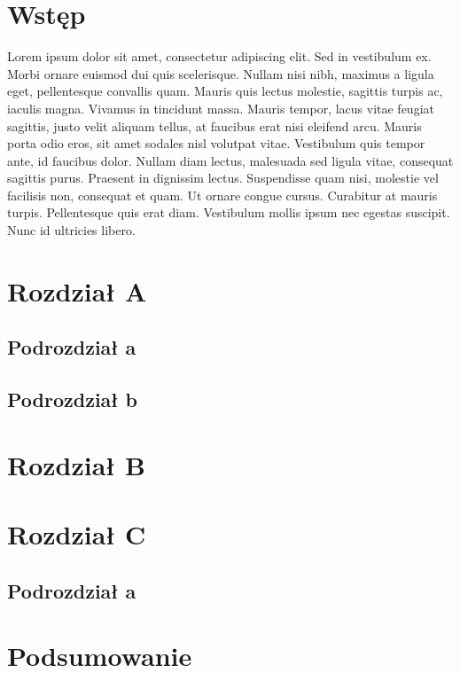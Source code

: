 \documentclass[12pt, letterpaper]{article}
\begin{document}
\tableofcontents

\pagebreak

\section{Wstęp}
Lorem ipsum dolor sit amet, consectetur adipiscing elit. Sed in vestibulum ex. 
Morbi ornare euismod dui quis scelerisque. Nullam nisi nibh, maximus a ligula eget, 
pellentesque convallis quam. Mauris quis lectus molestie, sagittis turpis ac, iaculis 
magna. Vivamus in tincidunt massa. Mauris tempor, lacus vitae feugiat sagittis, 
justo velit aliquam tellus, at faucibus erat nisi eleifend arcu. Mauris porta 
odio eros, sit amet sodales nisl volutpat vitae. Vestibulum quis tempor ante, 
id faucibus dolor. Nullam diam lectus, malesuada sed ligula vitae, consequat 
sagittis purus. Praesent in dignissim lectus. Suspendisse quam nisi, molestie 
vel facilisis non, consequat et quam. Ut ornare congue cursus. Curabitur 
at mauris turpis. Pellentesque quis erat diam. Vestibulum mollis ipsum nec 
egestas suscipit. Nunc id ultricies libero.

\section{Rozdział A}
\subsection{Podrozdział a}
\subsection{Podrozdział b}
\section{Rozdział B}
\section{Rozdział C}
\subsection{Podrozdział a}
\section{Podsumowanie}
\end{document}

